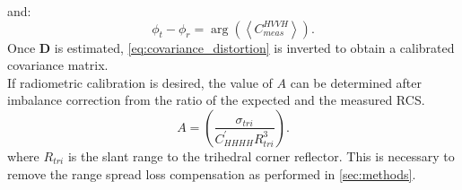 and:
\begin{equation}
	\phi_t - \phi_r =\operatorname{arg}\left( \left<C_{meas}^{HVVH}\right>\right).
\end{equation}
Once $\mathbf{D}$ is estimated, \autoref{eq:covariance_distortion} is inverted to obtain a calibrated covariance matrix.\\
If radiometric calibration is desired, the value of $A$ can be determined after imbalance correction from the ratio of the expected and the measured RCS.
\begin{equation}
	A =	\left(\frac{\sigma_{tri}}{C^{\prime}_{HHHH} R_{tri}^{3}}\right).
\end{equation}
where $R_{tri}$ is the slant range to the trihedral corner reflector. This is necessary to remove the range spread loss compensation as performed in \autoref{sec:methods}.
